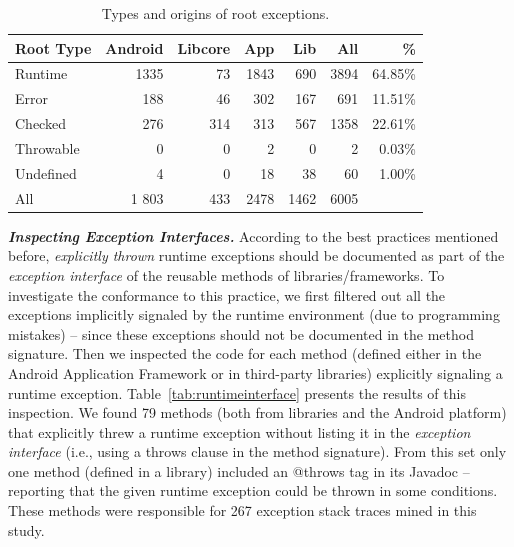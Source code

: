 
\begin{table}
\scriptsize
\centering
\begin{tabular}{lrrrrrr}
    \hline
    \bfseries{Root Type} & \bfseries{Android} & \bfseries{Libcore} & \bfseries{App} & \bfseries{Lib}  & \bfseries{All} & \bfseries{\%} \\
    \hline

Runtime	&	1335	&	73	&	1843	&	690  &	3894 & 64.85\% \\  %
Error	       &	 188              &	 46	&	302             &	167	           &	691 & 11.51\%	\\
Checked	&	276           &	314	&	313          &	567	           &	1358 & 22.61\%	\\
Throwable	&	0	       &	0	&	2            &	0         &	2 & 0.03\%	\\
Undefined	&	4	&	0	&	18		&	38	   &	60	& 1.00\% \\
 \hline
All		& 1  803	&	433	&	2478	&	1462	&	6005 	\\
    \hline
  \end{tabular}
\caption{Types and origins of root exceptions.}
  \label{tab:typeroottab}
\end{table}

\bigskip


\bigskip

\emph{\textbf{Inspecting Exception Interfaces.}}  According to the best practices mentioned before, 
 \emph{explicitly thrown} runtime exceptions 
should be documented as part of the \emph{exception interface} of the reusable
methods of libraries/frameworks. To investigate the conformance to this practice, we first filtered out all the exceptions implicitly
 signaled by  the runtime environment (due to programming mistakes) -- since these exceptions 
should not be documented in the method signature.  Then we inspected
the code for each method 
(defined either in the Android  Application Framework or in third-party libraries) 
explicitly signaling a runtime exception. 
Table~\ref{tab:runtimeinterface} presents the results of this inspection. 
We found 79 methods (both from libraries and the Android platform) that  explicitly threw a runtime exception 
without listing it in the \emph{exception interface} (i.e., using 
a throws clause in the method signature). From this set only one method (defined in a library)
included an @throws tag in its Javadoc -- reporting that the given runtime exception
could be thrown in some conditions. These methods were responsible for 
267 exception stack traces mined in this study.

